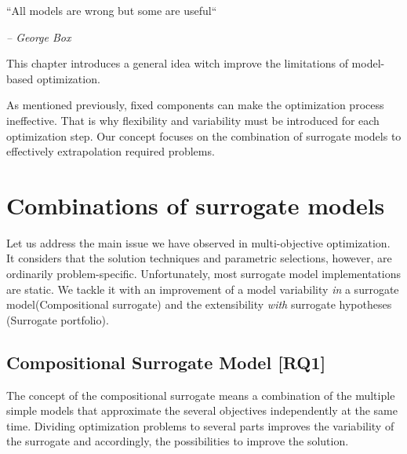 
    \epigraph{``All models are wrong but some are useful``}{\textit{– George Box}}

    This chapter introduces a general idea witch improve the limitations of model-based optimization.  

    As mentioned previously, fixed components can make the optimization process ineffective. That is why flexibility and variability must be introduced for each optimization step. Our concept focuses on the combination of surrogate models to effectively extrapolation required problems.





    \section{Combinations of surrogate models}

        Let us address the main issue we have observed in multi-objective optimization. It considers that the solution techniques and parametric selections, however, are ordinarily problem-specific. Unfortunately, most surrogate model implementations are static. We tackle it with an improvement of a model variability \emph{in} a surrogate model(Compositional surrogate) and the extensibility \emph{with} surrogate hypotheses (Surrogate portfolio).

        \subsection{Compositional Surrogate Model [RQ1]}
            The concept of the compositional surrogate means a combination of the multiple simple models that approximate the several objectives independently at the same time. Dividing optimization problems to several parts improves the variability of the surrogate and accordingly, the possibilities to improve the solution.

